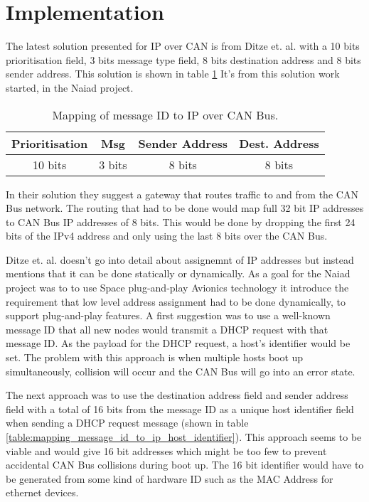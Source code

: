 \section{Implementation}\label{sec:implementation}
The latest solution presented for IP over CAN is from Ditze et. al. with a 10
bits prioritisation field, 3 bits message type field, 8 bits destination
address and 8 bits sender address. This solution is shown in table
\ref{table:mapping_message_id_to_ip} It's from this solution work started,
in the Naiad project.

\begin{table}[h]
\centering
    \caption{Mapping of message ID to IP over CAN Bus.}
    \begin{tabular}{|c|c|c|c|} \hline
    \label{table:mapping_message_id_to_ip}
    Prioritisation & Msg & Sender Address & Dest. Address  \\ \hline
            10 bits & 3 bits & 8 bits & 8 bits \\ \hline
    \end{tabular}
\end{table}


In their solution they suggest a gateway that routes traffic to and from the
CAN Bus network. The routing that had to be done would map full 32 bit IP
addresses to CAN Bus IP addresses of 8 bits. This would be done by dropping the
first 24 bits of the IPv4 address and only using the last 8 bits over the CAN
Bus.

Ditze et. al. doesn't go into
detail about assignemnt of IP addresses
but instead mentions that it can be done statically or dynamically. As a goal
for the Naiad project was to to use Space plug-and-play Avionics technology
it introduce the requirement that low level address assignment had to be done
dynamically, to support plug-and-play features.
A first suggestion was to use a well-known message ID that all new
nodes would transmit a DHCP request with that message ID.
As the payload for the DHCP request, a host's identifier would be set.
The problem with this approach is when multiple hosts boot up
simultaneously, collision will occur and the CAN Bus will go into an error
state.

The next approach was to use the destination address field and sender address field
with a total of 16 bits from the message ID as a unique host identifier field
when sending a DHCP request message (shown in table
\ref{table:mapping_message_id_to_ip_host_identifier}).
This approach seems to be viable and would
give 16 bit addresses which might be too few to prevent accidental CAN Bus
collisions during boot up. The 16 bit identifier would have to be generated
from some kind of hardware ID such as the MAC Address for ethernet devices.

